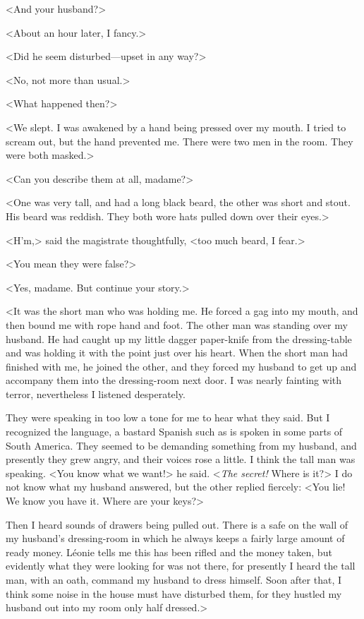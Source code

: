  <And your husband?> 

 <About an hour later, I fancy.> 

 <Did he seem disturbed—upset in any way?> 

 <No, not more than usual.> 

 <What happened then?> 

 <We slept. I was awakened by a hand being pressed over my mouth. I tried to scream out, but the hand prevented me. There were two men in the room. They were both masked.> 

 <Can you describe them at all, madame?> 

 <One was very tall, and had a long black beard, the other was short and stout. His beard was reddish. They both wore hats pulled down over their eyes.> 

 <H'm,> said the magistrate thoughtfully, <too much beard, I fear.> 

 <You mean they were false?> 

 <Yes, madame. But continue your story.> 

 <It was the short man who was holding me. He forced a gag into my mouth, and then bound me with rope hand and foot. The other man was standing over my husband. He had caught up my little dagger paper-knife from the dressing-table and was holding it with the point just over his heart. When the short man had finished with me, he joined the other, and they forced my husband to get up and accompany them into the dressing-room next door. I was nearly fainting with terror, nevertheless I listened desperately. 

 They were speaking in too low a tone for me to hear what they said. But I recognized the language, a bastard Spanish such as is spoken in some parts of South America. They seemed to be demanding something from my husband, and presently they grew angry, and their voices rose a little. I think the tall man was speaking. <You know what we want!> he said. <\emph{The secret!} Where is it?> I do not know what my husband answered, but the other replied fiercely: <You lie! We know you have it. Where are your keys?> 

 Then I heard sounds of drawers being pulled out. There is a safe on the wall of my husband's dressing-room in which he always keeps a fairly large amount of ready money. Léonie tells me this has been rifled and the money taken, but evidently what they were looking for was not there, for presently I heard the tall man, with an oath, command my husband to dress himself. Soon after that, I think some noise in the house must have disturbed them, for they hustled my husband out into my room only half dressed.> 

